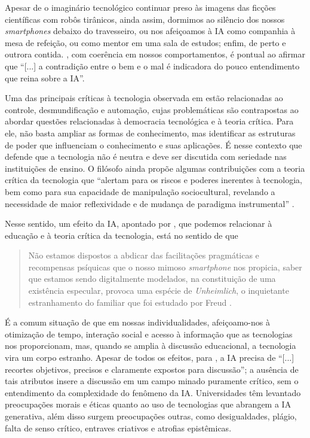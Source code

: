 \documentclass[portuguese]{textolivre}
\begin{document}
Apesar de o imaginário tecnológico continuar preso às imagens das ficções científicas com robôs tirânicos, ainda assim, dormimos ao silêncio dos nossos \emph{smartphones} debaixo do travesseiro, ou nos afeiçoamos à IA como companhia à mesa de refeição, ou como mentor em uma sala de estudos; enfim, de perto e outrora contida. \textcite[p. 14]{santaella2023inteligencia}, com coerência em nossos comportamentos, é pontual ao afirmar que “[...] a contradição entre o bem e o mal é indicadora do pouco entendimento que reina sobre a IA”.

Uma das principais críticas à tecnologia observada em \textcite{feenberg2004} estão relacionadas ao controle, desmundificação e automação, cujas problemáticas são contrapostas ao abordar questões relacionadas à democracia tecnológica e à teoria crítica. Para ele, não basta ampliar as formas de conhecimento, mas identificar as estruturas de poder que influenciam o conhecimento e suas aplicações. É nesse contexto que defende que a tecnologia não é neutra e deve ser discutida com seriedade nas instituições de ensino. O filósofo ainda propõe algumas contribuições com a teoria crítica da tecnologia que “alertam para os riscos e poderes inerentes à tecnologia, bem como para sua capacidade de manipulação sociocultural, revelando a necessidade de maior reflexividade e de mudança de paradigma instrumental” \cite[p. 20]{ninis2013}.

Nesse sentido, um efeito da IA, apontado por \textcite{santaella2023inteligencia}, que podemos relacionar à educação e à teoria crítica da tecnologia, está no sentido de que

\begin{quote}
    Não estamos dispostos a abdicar das facilitações pragmáticas e recompensas psíquicas que o nosso mimoso \emph{smartphone} nos propicia, saber que estamos sendo digitalmente modelados, na constituição de uma existência especular, provoca uma espécie de \emph{Unheimlich}, o inquietante estranhamento do familiar que foi estudado por Freud \cite[p. 17]{santaella2023inteligencia}.
\end{quote}

É a comum situação de que em nossas individualidades, afeiçoamo-nos à otimização de tempo, interação social e acesso à informação que as tecnologias nos proporcionam, mas, quando se amplia à discussão educacional, a tecnologia vira um corpo estranho. Apesar de todos os efeitos, para \textcite[p. 23]{santaella2023inteligencia}, a IA precisa de “[...] recortes objetivos, precisos e claramente expostos para discussão”; a ausência de tais atributos insere a discussão em um campo minado puramente crítico, sem o entendimento da complexidade do fenômeno da IA. Universidades têm levantado preocupações morais e éticas quanto ao uso de tecnologias que abrangem a IA generativa, além disso surgem preocupações outras, como desigualdades, plágio, falta de senso crítico, entraves criativos e atrofias epistêmicas.
\end{document}
